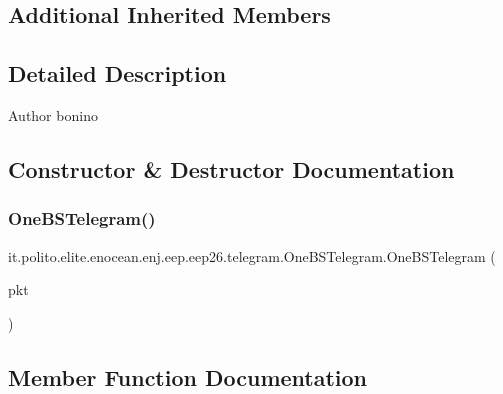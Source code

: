 \subsection*{Additional Inherited Members}


\subsection{Detailed Description}
\begin{DoxyAuthor}{Author}
bonino 
\end{DoxyAuthor}


\subsection{Constructor \& Destructor Documentation}
\hypertarget{classit_1_1polito_1_1elite_1_1enocean_1_1enj_1_1eep_1_1eep26_1_1telegram_1_1_one_b_s_telegram_a165137b27e036ceb182b0feaee86747a}{}\label{classit_1_1polito_1_1elite_1_1enocean_1_1enj_1_1eep_1_1eep26_1_1telegram_1_1_one_b_s_telegram_a165137b27e036ceb182b0feaee86747a} 
\subsubsection{\texorpdfstring{One\+B\+S\+Telegram()}{OneBSTelegram()}}
{\footnotesize\ttfamily it.\+polito.\+elite.\+enocean.\+enj.\+eep.\+eep26.\+telegram.\+One\+B\+S\+Telegram.\+One\+B\+S\+Telegram (\begin{DoxyParamCaption}\item[{\hyperlink{classit_1_1polito_1_1elite_1_1enocean_1_1protocol_1_1serial_1_1v3_1_1network_1_1packet_1_1_e_s_p3_packet}{E\+S\+P3\+Packet}}]{pkt }\end{DoxyParamCaption})}



\subsection{Member Function Documentation}
\hypertarget{classit_1_1polito_1_1elite_1_1enocean_1_1enj_1_1eep_1_1eep26_1_1telegram_1_1_one_b_s_telegram_a50662d53c49601d88b3a0cb831b48bd5}{}\label{classit_1_1polito_1_1elite_1_1enocean_1_1enj_1_1eep_1_1eep26_1_1telegram_1_1_one_b_s_telegram_a50662d53c49601d88b3a0cb831b48bd5} 
